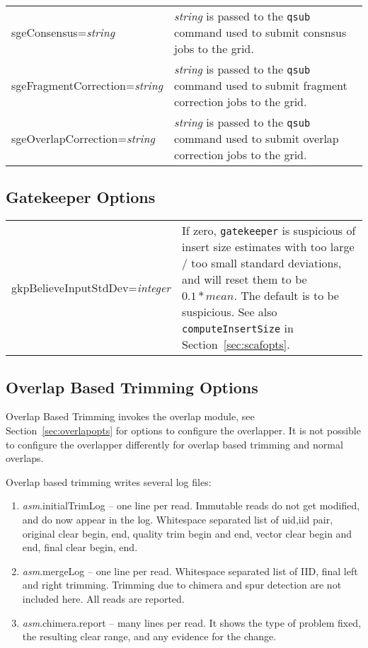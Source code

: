 \documentclass[twoside,11pt]{article}
\begin{document}
\begin{longtable}{lp{3.0in}}
sgeConsensus={\it string} &
{\it string} is passed to the {\tt qsub} command used to submit consnsus jobs to the grid.
\\

sgeFragmentCorrection={\it string} &
{\it string} is passed to the {\tt qsub} command used to submit fragment correction jobs to the grid.
\\

sgeOverlapCorrection={\it string} &
{\it string} is passed to the {\tt qsub} command used to submit overlap correction jobs to the grid.
\\

\end{longtable}



\subsection{Gatekeeper Options}
\label{sec:gkpopts}

\begin{longtable}{lp{3.0in}}
gkpBelieveInputStdDev={\it integer} &
If zero, {\tt gatekeeper} is suspicious of insert size estimates with
too large / too small standard deviations, and will reset them to be
$0.1 * mean$.  The default is to be suspicious.  See also {\tt
computeInsertSize} in Section~\ref{sec:scafopts}.
\\
\end{longtable}


\subsection{Overlap Based Trimming Options}
\label{sec:obtopts}

Overlap Based Trimming invokes the overlap module, see
Section~\ref{sec:overlapopts} for options to configure the overlapper.
It is not possible to configure the overlapper differently for overlap
based trimming and normal overlaps.

Overlap based trimming writes several log files:

\begin{enumerate}
\item {\it asm}.initialTrimLog -- one line per read.  Immutable reads do not
get modified, and do now appear in the log.  Whitespace separated list
of uid,iid pair, original clear begin, end, quality trim begin and
end, vector clear begin and end, final clear begin, end.

\item {\it asm}.mergeLog -- one line per read.  Whitespace separated list of
IID, final left and right trimming.  Trimming due to chimera and spur
detection are not included here.  All reads are reported.

\item {\it asm}.chimera.report -- many lines per read.  It shows the type of
problem fixed, the resulting clear range, and any evidence for the
change.
\end{enumerate}
\end{document}
